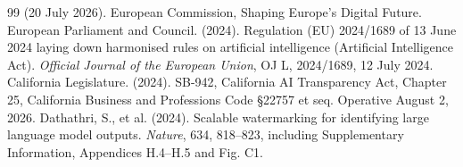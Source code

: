\documentclass[11pt]{article}
\begin{document}
\begin{thebibliography}{99}
(20 July 2026). European Commission, Shaping Europe's Digital Future.
 European Parliament and Council. (2024). Regulation (EU)
2024/1689 of 13 June 2024 laying down harmonised rules on artificial intelligence
(Artificial Intelligence Act). \emph{Official Journal of the European Union}, OJ L,
2024/1689, 12 July 2024.
 California Legislature. (2024). SB-942, California AI Transparency
Act, Chapter 25, California Business and Professions Code \S22757 et seq. Operative
August 2, 2026.
 Dathathri, S., et al. (2024). Scalable watermarking
for identifying large language model outputs. \emph{Nature}, 634, 818--823,
including Supplementary Information, Appendices H.4--H.5 and Fig. C1.
\end{thebibliography}
\end{document}

